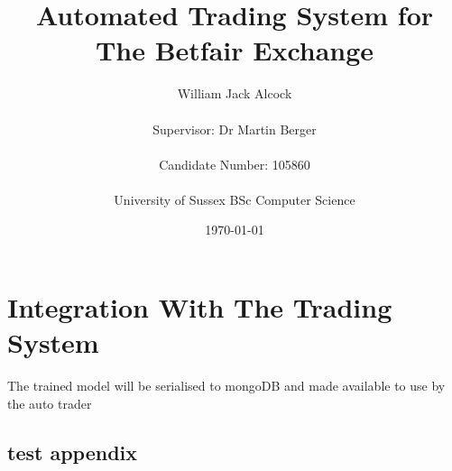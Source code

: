 \documentclass[11pt]{report}
\begin{document}
\title{Automated Trading System for The Betfair Exchange}
\author{William Jack Alcock\\\\Supervisor: Dr Martin Berger\\\\Candidate Number: 105860\\\\University of Sussex BSc Computer Science}
\date{\today}

\maketitle







\tableofcontents
\listoffigures
\listoftables


	







	


\chapter{Integration With The Trading System}
		The trained model will be serialised to mongoDB and made available to use by the auto trader 	



\begin{appendices}
	\chapter{test appendix}
\end{appendices}

\printbibliography[heading=bibintoc]
\end{document}
